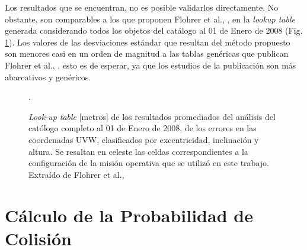 Los resultados que se encuentran, no es posible validarlos directamente. No obstante, son comparables a los que proponen Flohrer et al., \citep{flohrer2008assessment}, en la {\it{lookup table}} generada considerando todos los objetos del cat\'alogo al 01 de Enero de 2008 (Fig.  \ref{fig:flohrer}). Los valores de las desviaciones est\'andar que resultan del m\'etodo propuesto son menores casi en un orden de magnitud a las tablas gen\'ericas que publican Flohrer et al., \citep{flohrer2008assessment}, esto es de esperar, ya que los estudios de la publicaci\'on son m\'as abarcativos y gen\'ericos.\\

\begin{figure}[!h]
  \centering
  \caption{{\it{Look-up table}} [metros] de los resultados promediados del an\'alisis del cat\'ologo completo al 01 de Enero de 2008, de los errores en las coordenadas UVW, clasificados por excentricidad, inclinaci\'on y altura. Se resaltan en celeste las celdas correspondientes a la configuraci\'on de la misi\'on operativa que se utiliz\'o en este trabajo. Extra\'ido de Flohrer et al., \citep{flohrer2008assessment}}.
  \label{fig:flohrer}
\end{figure}

% 

\section{C\'alculo de la Probabilidad de Colisi\'on}

